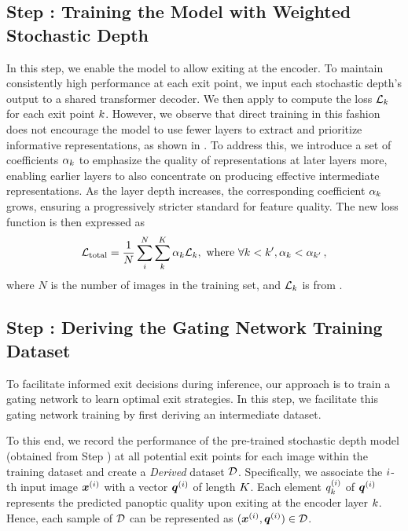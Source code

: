 \subsection{Step \stepA: Training the Model with Weighted Stochastic Depth}
\label{sec:SDwithP}
In this step, we enable the model to allow exiting at the encoder. To maintain consistently high performance at each exit point, we input each stochastic depth's output to a shared transformer decoder. We then apply  to compute the loss $\mathcal{L}_k$ for each exit point $k$. However, we observe that direct training in this fashion does not encourage the model to use fewer layers to extract and prioritize informative representations, as shown in . To address this, we introduce a set of coefficients $\alpha_k$ to emphasize the quality of representations at later layers more, enabling earlier layers to also concentrate on producing effective intermediate representations. As the layer depth increases, the corresponding coefficient $\alpha_k$ grows, ensuring a progressively stricter standard for feature quality. The new loss function is then expressed as
\begin{equation}
    \label{eq:loss}
    \mathcal{L}_{\text{total}} = \frac{1}{N}\sum_i^N\sum_{k}^K \alpha_k\mathcal{L}_k,\,\,{\text{where}}\ \forall k<k', \alpha_k<\alpha_{k'}\,,
\end{equation}
where $N$ is the number of images in the training set, and $\mathcal{L}_k$ is from .

%
\subsection{Step \stepB: Deriving the Gating Network Training Dataset}
To facilitate informed exit decisions during inference, our approach is to train a gating network to learn optimal exit strategies. In this step, we facilitate this gating network training by first deriving an intermediate dataset. 

To this end, we record the performance of the pre-trained stochastic depth model (obtained from Step \stepA) at all potential exit points for each image within the training dataset and create a \textit{Derived} dataset $\mathcal{D}$. Specifically, we associate the $i$-th input image ${\bm{x}}^{(i)}$ with a vector ${\bm{q}}^{(i)}$ of length $K$. Each element ${q}_k^{(i)}$ of ${\bm{q}}^{(i)}$ represents the predicted panoptic quality \cite{kirillov2019panoptic} upon exiting at the encoder layer $k$. Hence, each sample of $\mathcal{D}$ can be represented as $ ({\bm{x}}^{(i)}, {\bm{q}}^{(i)}) \in \mathcal{D}$.
%
